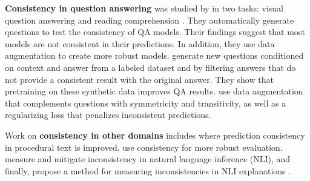 \textbf{Consistency in question answering} was studied by
\citet{ribeiro-etal-2019-red} in two tasks: visual question answering \cite{vqa} and reading comprehension \cite{squad}. They automatically generate questions to test the consistency of QA models.
Their findings suggest that most models are not consistent in their predictions. In addition, they use data augmentation to create more robust models.
\citet{alberti2019synthetic} generate new questions
conditioned on context and answer from a labeled dataset
and by filtering answers that do not provide a consistent
result with the original answer. They show that pretraining on these synthetic data improves QA results.
\citet{consistent-qa}  use data augmentation that complements questions with symmetricity and transitivity, as well as a regularizing loss that penalizes inconsistent predictions.

Work on \textbf{consistency in other domains}
includes \citep{du2019consistent} where  prediction
consistency in procedural text is improved. \citet{ribeiro-etal-2020-beyond} use consistency for more robust evaluation. \citet{li-etal-2019-logic} measure and mitigate inconsistency in natural language inference (NLI), and finally, \citet{camburu2020make} propose a method for measuring inconsistencies in NLI explanations \cite{camburu2018snli}.
